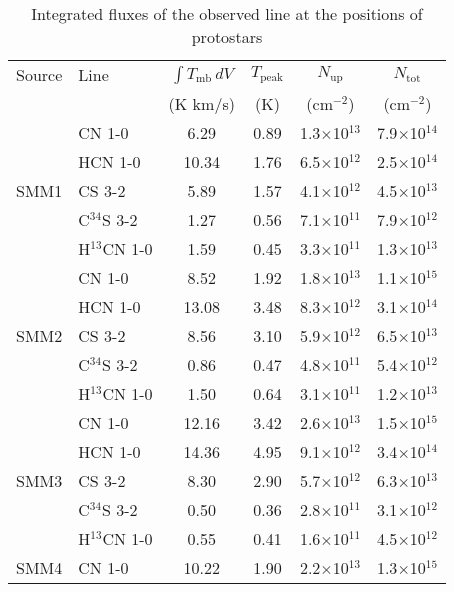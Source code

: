\documentclass{aa}
\begin{document}
\begin{appendix}
\begin{table*} \caption{Integrated fluxes of the observed line at the positions of protostars}      
      \label{table:fluxes}      %
\centering                          %
\begin{tabular}{l l c c c c}
\hline\hline Source & Line & $\int{T_{\mathrm{mb}} \, dV}$ & $T_\mathrm{peak}$ & $N_\mathrm{up}$ &
$N_\mathrm{tot}$\\ 
&  & (K km/s) & (K) & (cm$^{-2}$) & (cm$^{-2}$) \\ 
\hline \multirow{5}{*}{SMM1} & CN 1-0 & 6.29 & 0.89 & 1.3$\times$10$^{13}$ & 7.9$\times$10$^{14}$\\
 {} & HCN 1-0 & 10.34 & 1.76 & 6.5$\times$10$^{12}$ & 2.5$\times$10$^{14}$\\
  {} & CS 3-2 & 5.89 & 1.57 & 4.1$\times$10$^{12}$ & 4.5$\times$10$^{13}$\\
   {} & C$^{34}$S 3-2 & 1.27 & 0.56 & 7.1$\times$10$^{11}$ & 7.9$\times$10$^{12}$\\
    {} & H$^{13}$CN 1-0 & 1.59 & 0.45 & 3.3$\times$10$^{11}$ & 1.3$\times$10$^{13}$\\
\hline \multirow{5}{*}{SMM2} & CN 1-0 & 8.52 & 1.92 & 1.8$\times$10$^{13}$ & 1.1$\times$10$^{15}$ \\
 {} & HCN 1-0 & 13.08 & 3.48 & 8.3$\times$10$^{12}$ & 3.1$\times$10$^{14}$\\
{} & CS 3-2 & 8.56 & 3.10 & 5.9$\times$10$^{12}$ & 6.5$\times$10$^{13}$\\ 
{} & C$^{34}$S 3-2 & 0.86 & 0.47 & 4.8$\times$10$^{11}$ & 5.4$\times$10$^{12}$\\
 {} & H$^{13}$CN 1-0 & 1.50 & 0.64 & 3.1$\times$10$^{11}$ & 1.2$\times$10$^{13}$\\ 
 \hline \multirow{5}{*}{SMM3} & CN 1-0 & 12.16 & 3.42 & 2.6$\times$10$^{13}$ & 1.5$\times$10$^{15}$\\
  {} & HCN 1-0 & 14.36 & 4.95 & 9.1$\times$10$^{12}$ & 3.4$\times$10$^{14}$\\
   {} & CS 3-2 & 8.30 & 2.90 & 5.7$\times$10$^{12}$ & 6.3$\times$10$^{13}$\\ 
   {} & C$^{34}$S 3-2 & 0.50 & 0.36 & 2.8$\times$10$^{11}$ & 3.1$\times$10$^{12}$\\
    {} & H$^{13}$CN 1-0 & 0.55 & 0.41 & 1.6$\times$10$^{11}$ & 4.5$\times$10$^{12}$\\ 
    \hline \multirow{5}{*}{SMM4} & CN 1-0 & 10.22 & 1.90 & 2.2$\times$10$^{13}$ & 1.3$\times$10$^{15}$\\

\end{tabular}
\end{table*}
\end{appendix}
\end{document}
